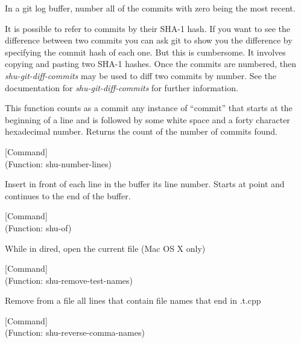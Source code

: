 \begin{doc-string}
In a git log buffer, number all of the commits with zero being the most
recent.

It is possible to refer to commits by their SHA-1 hash.  If you want to see the
difference between two commits you can ask git to show you the difference by
specifying the commit hash of each one.  But this is cumbersome.  It involves
copying and pasting two SHA-1 hashes.  Once the commits are numbered, then
\emph{shu-git-diff-commits} may be used to diff two commits by number.  See the
documentation for \emph{shu-git-diff-commits} for further information.

This function counts as a commit any instance of ``commit'' that starts at the
beginning of a line and is followed by some white space and a forty character
hexadecimal number.  Returns the count of the number of commits found.
\end{doc-string}

\vspace{1em}
\noindent
{}
\usebox{\funcname}
 \hfill [Command]\\%
 (Function: shu-number-lines)

\begin{doc-string}
Insert in front of each line in the buffer its line number.  Starts
at point and continues to the end of the buffer.
\end{doc-string}

\vspace{1em}
\noindent
{}
\usebox{\funcname}
 \hfill [Command]\\%
 (Function: shu-of)

\begin{doc-string}
While in dired, open the current file (Mac OS X only)
\end{doc-string}

\vspace{1em}
\noindent
{}
\usebox{\funcname}
 \hfill [Command]\\%
 (Function: shu-remove-test-names)

\begin{doc-string}
Remove from a file all lines that contain file names that end in .t.cpp
\end{doc-string}

\vspace{1em}
\noindent
{}
\usebox{\funcname}
 \hfill [Command]\\%
 (Function: shu-reverse-comma-names)

